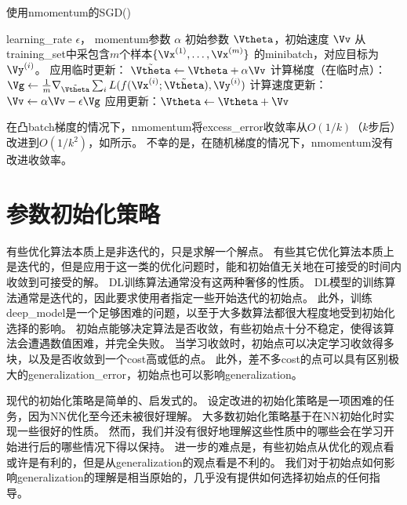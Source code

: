 \begin{algorithm}[ht]
\caption{使用\gls{nmomentum}的\gls{SGD}()}
\label{alg:nesterov}
\begin{algorithmic}
\REQUIRE  \gls{learning_rate} $\epsilon$， \gls{momentum}参数 $\alpha$
\REQUIRE 初始参数 $\Vtheta$，初始速度 $\Vv$
    \STATE 从\gls{training_set}中采包含$m$个样本$\{ \Vx^{(1)},\dots, \Vx^{(m)}\}$ 的\gls{minibatch}，对应目标为$\Vy^{(i)}$。
    \STATE 应用临时更新： $\tilde{\Vtheta} \leftarrow \Vtheta  + \alpha \Vv$
         \STATE 计算梯度（在临时点）：$\Vg \leftarrow 
         \frac{1}{m} \nabla_{\tilde{\Vtheta}} \sum_i L(f(\Vx^{(i)};\tilde{\Vtheta}),\Vy^{(i)})$
    \STATE 计算速度更新：$\Vv \leftarrow \alpha \Vv - 
    \epsilon \Vg$
    \STATE 应用更新：$\Vtheta \leftarrow \Vtheta + \Vv$ 
\ENDWHILE
\end{algorithmic}
\end{algorithm}



在凸\gls{batch}梯度的情况下，\gls{nmomentum}将\gls{excess_error}收敛率从$O(1/k)$（$k$步后）改进到$O(1/k^2)$，如\cite{Nesterov83b}所示。
不幸的是，在随机梯度的情况下，\gls{nmomentum}没有改进收敛率。


\section{参数初始化策略}
\label{sec:parameter_initialization_strategies}
有些优化算法本质上是非迭代的，只是求解一个解点。
有些其它优化算法本质上是迭代的，但是应用于这一类的优化问题时，能和初始值无关地在可接受的时间内收敛到可接受的解。
\gls{DL}训练算法通常没有这两种奢侈的性质。
\gls{DL}模型的训练算法通常是迭代的，因此要求使用者指定一些开始迭代的初始点。
此外，训练\gls{deep_model}是一个足够困难的问题，以至于大多数算法都很大程度地受到初始化选择的影响。
初始点能够决定算法是否收敛，有些初始点十分不稳定，使得该算法会遭遇数值困难，并完全失败。
当学习收敛时，初始点可以决定学习收敛得多块，以及是否收敛到一个\gls{cost}高或低的点。
此外，差不多\gls{cost}的点可以具有区别极大的\gls{generalization_error}，初始点也可以影响\gls{generalization}。


现代的初始化策略是简单的、启发式的。
设定改进的初始化策略是一项困难的任务，因为\gls{NN}优化至今还未被很好理解。
大多数初始化策略基于在\gls{NN}初始化时实现一些很好的性质。
然而，我们并没有很好地理解这些性质中的哪些会在学习开始进行后的哪些情况下得以保持。
进一步的难点是，有些初始点从优化的观点看或许是有利的，但是从\gls{generalization}的观点看是不利的。
我们对于初始点如何影响\gls{generalization}的理解是相当原始的，几乎没有提供如何选择初始点的任何指导。


